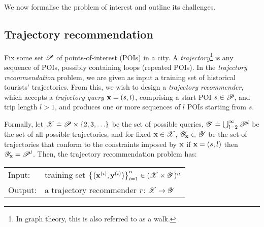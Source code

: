 
We now formalise the problem of interest and outline its challenges.

%
\subsection{Trajectory recommendation}

Fix some set $\mathscr{P}$ of points-of-interest (POIs) in a city.
A \emph{trajectory}\footnote{In graph theory, this is also referred to as a walk.} is any sequence of POIs, possibly containing loops (repeated POIs).
In the \emph{trajectory recommendation} problem, we are given as input a training set of historical tourists' trajectories.
From this, we wish to design a \emph{trajectory recommender}, which accepts a
\emph{trajectory query} $\mathbf{x} = (s, l)$, comprising a start POI $s \in \mathscr{P}$, and trip length $l \!>\! 1$, %
and produces one or more sequences of $l$ POIs starting from $s$. %

Formally, let $\mathscr{X} \stackrel{.}{=} \mathscr{P} \times \{ 2, 3, \ldots \}$ be the set of possible queries,
$\mathscr{Y} \stackrel{.}{=} \bigcup_{l = 2}^\infty \mathscr{P}^l$ be the set of all possible trajectories,
and for fixed $\mathbf{x} \in \mathscr{X}$, $\mathscr{Y}_{\mathbf{x}} \subset \mathscr{Y}$ be the set of trajectories that conform to the constraints imposed by $\mathbf{x}$
\ie if $\mathbf{x} = (s, l)$ then $\mathscr{Y}_{\mathbf{x}} = \mathscr{P}^l$.
Then, the {trajectory recommendation} problem has:

\vspace{0.5\baselineskip}

\begin{mdframed}[innertopmargin=3pt,innerbottommargin=3pt,skipbelow=5pt,roundcorner=8pt,backgroundcolor=red!3,topline=false,rightline=false,leftline=false,bottomline=false]
	\begin{tabular}{ll}
		{\sc Input}:  & training set $\left\{ \left( \mathbf{x}^{(i)}, \mathbf{y}^{(i)} \right) \right\}_{i = 1}^n \in ( \mathscr{X} \times \mathscr{Y} )^n$ \\
		{\sc Output}: & a trajectory recommender $r \colon \mathscr{X} \to \mathscr{Y}$ \\
	\end{tabular}
\end{mdframed}

\vspace{0.5\baselineskip}


